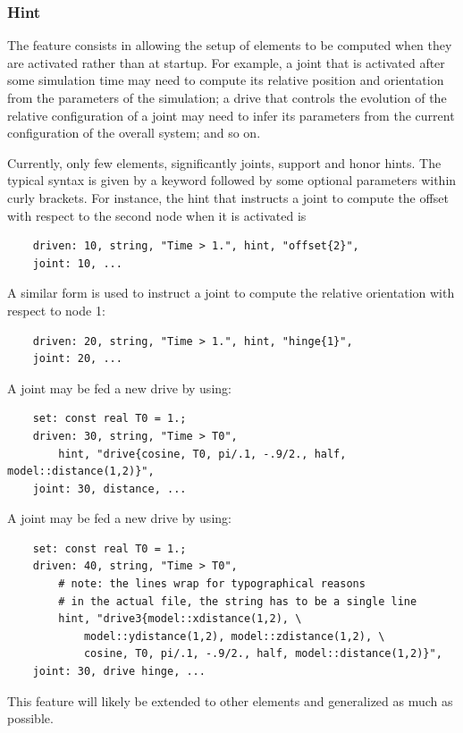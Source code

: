 \subsubsection{Hint}
The  feature consists in allowing the setup of elements
to be computed when they are activated rather than at startup.
For example, a joint that is activated after some simulation time
may need to compute its relative position and orientation
from the parameters of the simulation; a drive that controls
the evolution of the relative configuration of a joint may need
to infer its parameters from the current configuration
of the overall system; and so on.

Currently, only few elements, significantly joints, support 
and honor hints.
The typical syntax is given by a keyword followed by some optional
parameters within curly brackets.
For instance, the hint that instructs a joint to compute the offset
with respect to the second node when it is activated is
\begin{verbatim}
    driven: 10, string, "Time > 1.", hint, "offset{2}",
    joint: 10, ...
\end{verbatim}
A similar form is used to instruct a joint to compute the relative
orientation with respect to node 1:
\begin{verbatim}
    driven: 20, string, "Time > 1.", hint, "hinge{1}",
    joint: 20, ...
\end{verbatim}
A  joint may be fed a new drive by using:
\begin{verbatim}
    set: const real T0 = 1.;
    driven: 30, string, "Time > T0",
        hint, "drive{cosine, T0, pi/.1, -.9/2., half, model::distance(1,2)}",
    joint: 30, distance, ... 
\end{verbatim}
A  joint may be fed a new drive by using:
\begin{verbatim}
    set: const real T0 = 1.;
    driven: 40, string, "Time > T0",
        # note: the lines wrap for typographical reasons
        # in the actual file, the string has to be a single line
        hint, "drive3{model::xdistance(1,2), \
            model::ydistance(1,2), model::zdistance(1,2), \
            cosine, T0, pi/.1, -.9/2., half, model::distance(1,2)}",
    joint: 30, drive hinge, ... 
\end{verbatim}

This feature will likely be extended to other elements
and generalized as much as possible.



